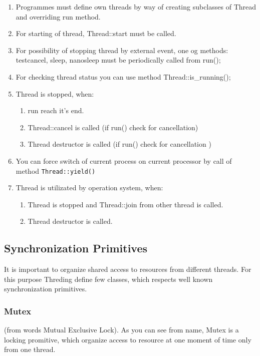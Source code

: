 \documentclass[10pt]{article}
\begin{document}
 \begin{enumerate}
  \item Programmes must define own threads by way of creating subclasses of 
  Thread and overriding run method.
  \item For starting of thread, Thread::start must be called.
  \item For possibility of stopping thread by external event, one og methods:
  testcancel, sleep, nanosleep must be periodically called from run();
  \item For checking thread status you can use method Thread::is\_running();
  \item Thread is stopped, when:
   \begin{enumerate}
     \item run reach it's end.
     \item Thread::cancel is called (if run() check for cancellation)
     \item Thread destructor is called (if run() check for cancellation )
   \end{enumerate} 
  \item You can force switch of current process on current processor
   by call of method \verb|Thread::yield()|
  \item Thread is utilizated by operation system, when:
   \begin{enumerate}
     \item Thread is stopped and Thread::join from other thread is called.
     \item Thread destructor is called.
   \end{enumerate} 
 \end{enumerate}

\subsection{ Synchronization Primitives }

 It is important to organize shared access to resources from different
 threads. For this purpose Threding define few classes, which respects 
 well known synchronization primitives.

\subsubsection{ Mutex }
 
 (from words Mutual Exclusive Lock). 
 As you can see from name, Mutex is a locking promitive, which organize
access to resource at one moment of time only from one thread.
\end{document}
